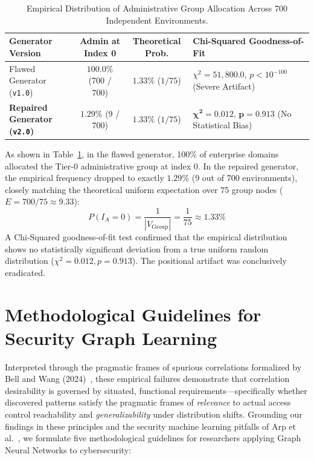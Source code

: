 \begin{table}[ht]
\centering
\small
\caption{Empirical Distribution of Administrative Group Allocation Across 700 Independent Environments.}
\label{tab:leakage_audit}
\begin{tabularx}{\textwidth}{l c c X}
\toprule
\textbf{Generator Version} & \textbf{Admin at Index 0} & \textbf{Theoretical Prob.} & \textbf{Chi-Squared Goodness-of-Fit} \\
\midrule
Flawed Generator (\texttt{v1.0}) & $100.0\%$ (700 / 700) & $1.33\%$ ($1/75$) & $\chi^2 = 51,800.0, \, p < 10^{-100}$ (Severe Artifact) \\
\textbf{Repaired Generator (\texttt{v2.0})} & $\mathbf{1.29\%}$ (9 / 700) & $\mathbf{1.33\%}$ ($1/75$) & $\mathbf{\chi^2 = 0.012, \, p = 0.913}$ (No Statistical Bias) \\
\bottomrule
\end{tabularx}
\end{table}

As shown in Table~\ref{tab:leakage_audit}, in the flawed generator, 100\% of enterprise domains allocated the Tier-0 administrative group at index 0. In the repaired generator, the empirical frequency dropped to exactly $1.29\%$ (9 out of 700 environments), closely matching the theoretical uniform expectation over 75 group nodes ($E = 700/75 \approx 9.33$):
\begin{equation}
P(I_A = 0) = \frac{1}{|V_{\text{Group}}|} = \frac{1}{75} \approx 1.33\%
\end{equation}
A Chi-Squared goodness-of-fit test confirmed that the empirical distribution shows no statistically significant deviation from a true uniform random distribution ($\chi^2 = 0.012, p = 0.913$). The positional artifact was conclusively eradicated.

\section{Methodological Guidelines for Security Graph Learning}
Interpreted through the pragmatic frames of spurious correlations formalized by Bell and Wang (2024)~\cite{bell2024pragmatic}, these empirical failures demonstrate that correlation desirability is governed by situated, functional requirements—specifically whether discovered patterns satisfy the pragmatic frames of \textit{relevance} to actual access control reachability and \textit{generalizability} under distribution shifts. Grounding our findings in these principles and the security machine learning pitfalls of Arp et al.~\cite{arp2022dos}, we formulate five methodological guidelines for researchers applying Graph Neural Networks to cybersecurity:

